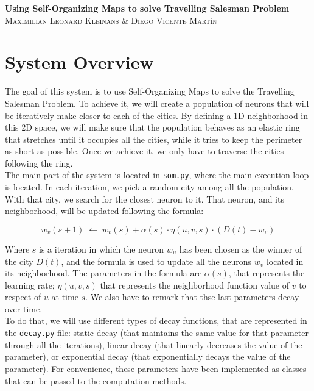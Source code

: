 \documentclass[11pt]{article}
\begin{document}
\begin{center}
  \Huge\textbf{Using Self-Organizing Maps to solve Travelling Salesman
    Problem}\\
  \vspace{1cm}
  \large\textsc{Maximilian Leonard Kleinans \& Diego Vicente Martín}
\end{center}

\section{System Overview}

The goal of this system is to use Self-Organizing Maps to solve the Travelling
Salesman Problem. To achieve it, we will create a population of neurons that
will be iteratively make closer to each of the cities. By defining a 1D
neighborhood in this 2D space, we will make sure that the population behaves as
an elastic ring that stretches until it occupies all the cities, while it tries
to keep the perimeter as short as possible. Once we achieve it, we only have to
traverse the cities following the ring.\\

The main part of the system is located in \texttt{som.py}, where the main
execution loop is located. In each iteration, we pick a random city among all
the population. With that city, we search for the closest neuron to it. That
neuron, and its neighborhood, will be updated following the formula:

$$
w_v(s+1) \; \leftarrow \;
w_v(s) + \alpha (s) \cdot \eta (u, v, s) \cdot (D(t) - w_v)
$$

Where $s$ is a iteration in which the neuron $w_u$ has been chosen as the
winner of the city $D(t)$, and the formula is used to update all the neurons
$w_v$ located in its neighborhood. The parameters in the formula are $\alpha(s)$,
that represents the learning rate; $\eta(u, v, s)$ that represents the
neighborhood function value of $v$ to respect of $u$ at time $s$. We also have
to remark that thse last parameters decay over time.\\

To do that, we will use different types of decay functions, that are represented
in the \texttt{decay.py} file: static decay (that maintains the same value for
that parameter through all the iterations), linear decay (that linearly
decreases the value of the parameter), or exponential decay (that exponentially
decays the value of the parameter). For convenience, these parameters have been
implemented as classes that can be passed to the computation methods.\\
\end{document}
